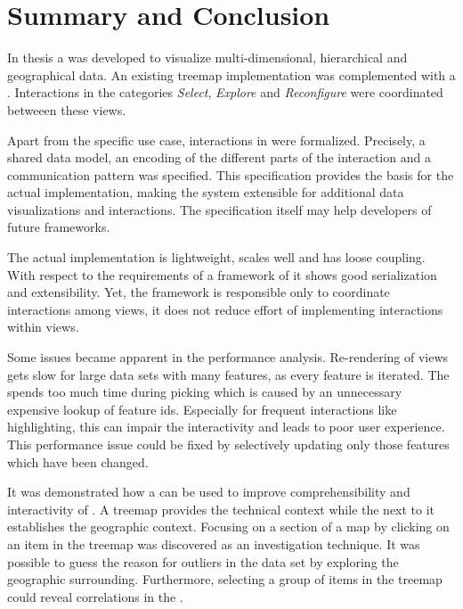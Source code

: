 \chapter{Summary and Conclusion}\label{sec:conclusion}

In thesis a \cmv{} was developed to visualize multi-dimensional, hierarchical and geographical data.
An existing treemap implementation was complemented with a \gv{}.
Interactions in the categories \emph{Select}, \emph{Explore} and \emph{Reconfigure} were coordinated betweeen these views.

Apart from the specific use case, interactions in \cmvs{} were formalized.
Precisely, a shared data model, an encoding of the different parts of the interaction and a communication pattern was specified.
This specification provides the basis for the actual implementation, making the system extensible for additional data visualizations and interactions.
The specification itself may help developers of future \cmv{} frameworks.

The actual implementation is lightweight, scales well and has loose coupling.
With respect to the requirements of a framework of \cmvs{} it shows good serialization and extensibility.
Yet, the framework is responsible only to coordinate interactions among views, it does not reduce effort of implementing interactions within views.

Some issues became apparent in the performance analysis.
Re-rendering of views gets slow for large data sets with many features, as every feature is iterated.
The \tmap{} spends too much time during picking which is caused by an unnecessary expensive lookup of feature ids.
Especially for frequent interactions like highlighting, this can impair the interactivity and leads to poor user experience.
This performance issue could be fixed by selectively updating only those features which have been changed.

It was demonstrated how a \cmv{} can be used to improve comprehensibility and interactivity of \tmaps{}.
A treemap provides the technical context while the \gv{} next to it establishes the geographic context.
Focusing on a section of a map by clicking on an item in the treemap was discovered as an investigation technique.
It was possible to guess the reason for outliers in the data set by exploring the geographic surrounding.
Furthermore, selecting a group of items in the treemap could reveal correlations in the \gv{}.

